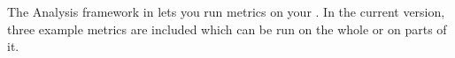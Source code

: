 The Analysis framework in \app{} lets you run metrics on your \gdproject{}. In the current version, three example metrics are included which can be run on the whole \gdproject{} or on parts of it.
